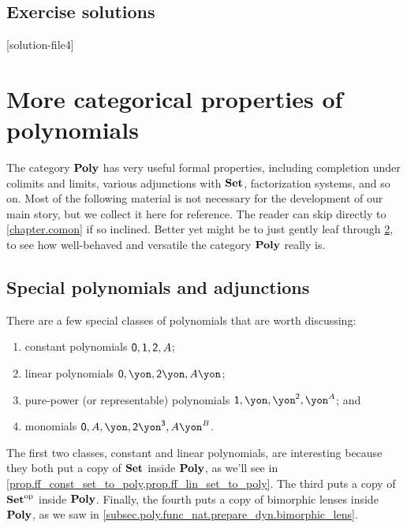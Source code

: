 \documentclass[Book-Poly]{subfiles}
\begin{document}

\section{Exercise solutions}
{\footnotesize
}

[solution-file4]

\chapter{More categorical properties of polynomials} \label{sec.bonus_poly}

The category $\mathbf{Poly}$ has very useful formal properties, including completion under colimits and limits, various adjunctions with $\mathbf{Set}$, factorization systems, and so on. Most of the following material is not necessary for the development of our main story, but we collect it here for reference. The reader can skip directly to \cref{chapter.comon} if so inclined. Better yet might be to just gently leaf through \cref{sec.bonus_poly}, to see how well-behaved and versatile the category $\mathbf{Poly}$ really is.

\section{Special polynomials and adjunctions}

There are a few special classes of polynomials that are worth discussing: 
\begin{enumerate}[label=\alph*)]
	\item constant polynomials $\textsf{0},\textsf{1},\textsf{2},A$; 
	\item linear polynomials $\0,\yon, \2\yon, A\yon$;
	\item pure-power (or representable) polynomials $\1, \yon, \yon^\2, \yon^A$; and 
	\item monomials $\0, A, \yon, \2\yon^\3, A\yon^B$.
\end{enumerate}
The first two classes, constant and linear polynomials, are interesting because they both put a copy of $\mathbf{Set}$ inside $\mathbf{Poly}$, as we'll see in \cref{prop.ff_const_set_to_poly,prop.ff_lin_set_to_poly}. 
The third puts a copy of $\mathbf{Set}^{\textnormal{op}}$ inside $\mathbf{Poly}$.
Finally, the fourth puts a copy of bimorphic lenses inside $\mathbf{Poly}$, as we saw in \cref{subsec.poly.func_nat.prepare_dyn.bimorphic_lens}.
\end{document}
